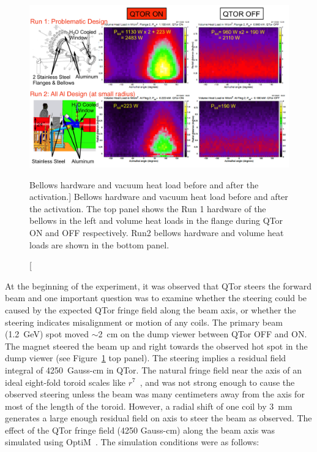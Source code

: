 \begin{singlespace}
\begin{figure}[!h]
	\begin{center}
		\includegraphics[width=15.0cm]{figures/vacuumLeakProblem}
	\end{center}
	\caption
		[Bellows hardware and vacuum heat load before and after the activation.]
		{Bellows hardware and vacuum heat load before and after the activation. The top panel shows the Run 1 hardware of the bellows in the left and volume heat loads in the flange during QTor ON and OFF respectively. Run2 bellows hardware and volume heat loads are shown in the bottom panel.}
		\label{fig:vacuumLeakProblem}
\end{figure}
\end{singlespace}

At the beginning of the experiment, it was observed that QTor steers the forward beam and one important question was to examine whether the steering could be caused by the expected QTor fringe field along the beam axis, or whether the steering indicates misalignment or motion of any coils. The primary beam (1.2~GeV) spot moved $\sim$2~cm on the dump viewer between QTor OFF and ON. The magnet steered the beam up and right towards the observed hot spot in the dump viewer (see Figure~\ref{fig:vacuumLeakProblem} top panel). The steering implies a residual field integral of 4250~Gauss-cm in QTor. The natural fringe field near the axis of an ideal eight-fold toroid scales like $r^{7}$~\cite{elog:rob_qtor2}, and was not strong enough to cause the observed steering unless the beam was many centimeters away from the axis for most of the length of the toroid. However, a radial shift of one coil by 3~mm generates a large enough residual field on axis to steer the beam as observed. 
The effect of the QTor fringe field (4250 Gauss-cm) along the beam axis was simulated using OptiM~\cite{elog:nur_qtor3}. The simulation conditions were as follows: 

